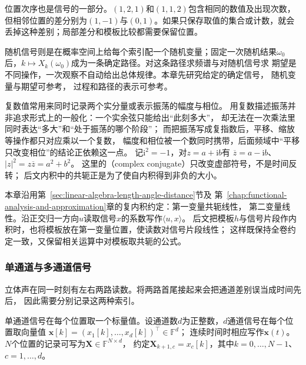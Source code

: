 位置次序也是信号的一部分。$(1,2,1)$和$(1,1,2)$包含相同的数值及出现次数，
但相邻位置的差分别为$(1,-1)$与$(0,1)$。如果只保存取值的集合或计数，就会
丢掉这种差别；局部差分和模板比较都需要保留位置。

随机信号则是在概率空间上给每个索引配一个随机变量；固定一次随机结果$\omega_0$
后，$k\mapsto X_k(\omega_0)$成为一条确定路径。对这条路径求频谱与对随机信号求
期望是不同操作，一次观察不自动给出总体规律。本章先研究给定的确定信号，
随机变量与期望可参考，
过程和路径的表示可参考。

复数值常用来同时记录两个实分量或表示振荡的幅度与相位。
用复数描述振荡并非追求形式上的一般化：一个实余弦只能给出“此刻多大”，
却无法在一次乘法里同时表达“多大”和“处于振荡的哪个阶段”；
而把振荡写成复指数后，平移、缩放等操作都只对应乘以一个复数，
幅度和相位被一个数同时携带，后面频域中“平移只改变相位”的结论正依赖这一点。
记$\mathrm i^2=-1$，对$z=a+\mathrm ib$有
$\overline z=a-\mathrm ib$、$|z|^2=z\overline z=a^2+b^2$。
这里的（complex conjugate）只改变虚部符号，不是时间反转；
后文内积中的共轭正是为了使自内积得到非负的大小。

本章沿用第~\ref{sec:linear-algebra-length-angle-distance}节及
第~\ref{chap:functional-analysis-and-approximation}章的复内积约定：第一变量共轭线性，
第二变量线性。沿正交归一方向$u$读取信号$x$的系数写作$\langle u,x\rangle$。
后文把模板$h$与信号片段作内积时，也将模板放在第一变量位置，使读数对信号片段线性；
这样既保持全卷约定一致，又保留相关运算中对模板取共轭的公式。

\subsubsection{单通道与多通道信号}

立体声在同一时刻有左右两路读数。将两路首尾接起来会把通道差别误当成时间先后，
因此需要分别记录这两种索引。
\begin{definition}[标量信号与向量值信号]
  \label{def:signal-multichannel}
  单通道信号在每个位置取一个标量值。设通道数$d$为正整数，$d$通道信号在每个位置取向量值
  $\bm x[k]=(x_1[k],\ldots,x_d[k])^\top\in\mathbb F^d$；
  连续时间时相应写作$\bm x(t)$。
  $N$个位置的记录可写为$\bm X\in\mathbb F^{N\times d}$，
  约定$\bm X_{k+1,c}=x_c[k]$，其中$k=0,\ldots,N-1$、$c=1,\ldots,d$。
\end{definition}

